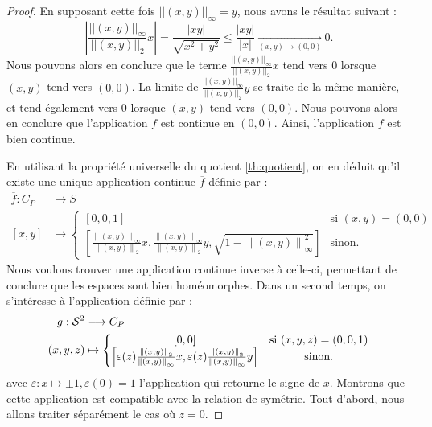 \documentclass[hidelinks, 10pt]{article}
\begin{document}
\begin{proof}
En supposant cette fois $||(x,y)||_\infty=y$, nous avons le résultat suivant : \[\left|\frac{||(x,y)||_\infty}{||(x,y)||_2}x\right|=\frac{|xy|}{\sqrt{x^2+y^2}}\leq\frac{|xy|}{|x|}\underset{(x,y)\rightarrow(0,0)}{\longrightarrow}0.\]Nous pouvons alors en conclure que le terme $\frac{||(x,y)||_\infty}{||(x,y)||_2}x$ tend vers 0 lorsque $(x,y)$ tend vers $(0,0)$. La limite de $\frac{||(x,y)||_\infty}{||(x,y)||_2}y$ se traite de la même manière, et tend également vers 0 lorsque $(x,y)$ tend vers $(0,0)$. Nous pouvons alors en conclure que l'application $f$ est continue en $(0,0)$. Ainsi, l'application $f$ est bien continue.

\bigskip En utilisant la propriété universelle du quotient \ref{th:quotient}, on en déduit qu'il existe une unique application continue $\overline{f}$ définie par : \[\begin{split}
\overline{f}:C_P&\longrightarrow S\\
[x,y]&\mapsto\left\{\begin{matrix}
    [0,0,1]&\text{si } (x,y)=(0,0)\\
\left[\frac{\left \|(x,y)  \right \|_\infty}{\left \| (x,y) \right \|_2}x,\frac{\left \|(x,y)  \right \|_\infty}{\left \| (x,y) \right \|_2}y,\sqrt{1-\left \|(x,y)  \right \|_\infty^2}\right]&\text{sinon.}
\end{matrix}\right.
\end{split}\]Nous voulons trouver une application continue inverse à celle-ci, permettant de conclure que les espaces sont bien homéomorphes.
Dans un second temps, on s'intéresse à l'application définie par : \[\begin{split}
g:\mathcal{S}^{2}&\longrightarrow C_P\\
(x,y,z)&\mapsto\left\{\begin{matrix}
    [0,0]&\text{si } (x,y,z)=(0,0,1)\\
\left[\varepsilon(z)\frac{\left \| (x,y) \right \|_2}{\left \| (x,y) \right \|_\infty}x,\varepsilon(z)\frac{\left \| (x,y) \right \|_2}{\left \| (x,y) \right \|_\infty}y\right]&\text{sinon.}
\end{matrix}\right.
\end{split}\]avec $\varepsilon:x\mapsto\pm1,  \varepsilon(0)=1$ l'application qui retourne le signe de $x$. Montrons que cette application est compatible avec la relation de symétrie. Tout d'abord, nous allons traiter séparément le cas où $z=0$. 


\end{proof}
\end{document}
